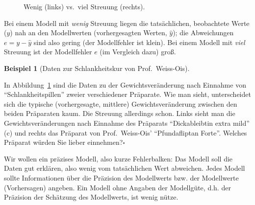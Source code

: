 \documentclass[
  letterpaper,
  twoside,
  open=any]{scrbook}
\theoremstyle{definition}
\theoremstyle{definition}
\newtheorem{example}{Beispiel}[chapter]
\theoremstyle{definition}
\theoremstyle{remark}
\begin{document}
\begin{figure}


\caption{\label{fig-streuung}Wenig (links) vs.~viel Streuung (rechts).}

\end{figure}%

Bei einem Modell mit \emph{wenig} Streuung liegen die tatsächlichen,
beobachtete Werte (\(y\)) nah an den Modellwerten (vorhergesagten
Werten, \(\hat{y}\)); die Abweichungen \(e = y - \hat{y}\) sind also
gering (der Modellfehler ist klein). Bei einem Modell mit \emph{viel}
Streuung ist der Modellfehler \(e\) (im Vergleich dazu) groß.

\begin{example}[Daten zur Schlankheitskur von
Prof.~Weiss-Ois]\protect\hypertarget{exm-weiss-ois}{}\label{exm-weiss-ois}

In Abbildung~\ref{fig-streuung} sind die Daten zu der
Gewichtsveränderung nach Einnahme von \enquote{Schlankheitspillen}
zweier verschiedener Präparate. Wie man sieht, unterscheidet sich die
typische (vorhergesagte, mittlere) Gewichtsveränderung zwischen den
beiden Präparaten kaum. Die Streuung allerdings schon. Links sieht man
die Gewichtsveränderungen nach Einnahme des Präparats
\enquote{Dickableibtin extra mild} (c) und rechts das Präparat von
Prof.~Weiss-Ois' \enquote{Pfundafliptan Forte}. Welches Präparat würden
Sie lieber einnehmen?\(\square\)

\end{example}

Wir wollen ein präzises Modell, also kurze Fehlerbalken: Das Modell soll
die Daten gut erklären, also wenig vom tatsächlichen Wert abweichen.
Jedes Modell sollte Informationen über die Präzision des Modellwerts
bzw. der Modellwerte (Vorhersagen) angeben. Ein Modell ohne Angaben der
Modellgüte, d.h. der Präzision der Schätzung des Modellwerts, ist wenig
nütze.
\end{document}

